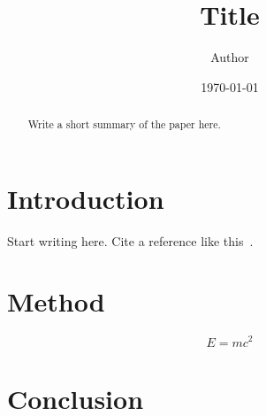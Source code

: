 \documentclass[11pt]{article}
\title{Title}
\author{Author}
\date{\today}
\begin{document}
\maketitle

\begin{abstract}
  Write a short summary of the paper here.
\end{abstract}

\section{Introduction}

Start writing here. Cite a reference like this~\cite{knuth1984}.

\section{Method}

\begin{equation}
  E = mc^2
  \label{eq:energy}
\end{equation}

\section{Conclusion}



\end{document}
